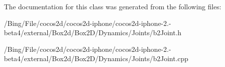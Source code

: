 The documentation for this class was generated from the following files\-:\begin{DoxyCompactItemize}
\item 
/\-Bing/\-File/cocos2d/cocos2d-\/iphone/cocos2d-\/iphone-\/2.-\/beta4/external/\-Box2d/\-Box2\-D/\-Dynamics/\-Joints/b2\-Joint.\-h\item 
/\-Bing/\-File/cocos2d/cocos2d-\/iphone/cocos2d-\/iphone-\/2.-\/beta4/external/\-Box2d/\-Box2\-D/\-Dynamics/\-Joints/b2\-Joint.\-cpp\end{DoxyCompactItemize}
